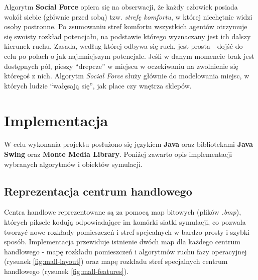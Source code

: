 \documentclass[a4paper, 12pt]{article}
\begin{document}
Algorytm \textbf{Social Force} opiera się na obserwacji, że każdy człowiek posiada wokół siebie (głównie przed sobą) tzw. \textit{strefę komfortu}, w której niechętnie widzi osoby postronne. Po zsumowaniu stref komfortu wszystkich agentów otrzymuje się swoisty rozkład potencjału, na podstawie którego wyznaczany jest ich dalszy kierunek ruchu. Zasada, według której odbywa się ruch, jest prosta - dojść do celu po polach o jak najmniejszym potencjale. Jeśli w danym momencie brak jest dostępnych pól, pieszy ``drepcze'' w miejscu w oczekiwaniu na zwolnienie się któregoś z nich. Algorytm \textit{Social Force} służy głównie do modelowania miejsc, w których ludzie ``wałęsają się'', jak place czy wnętrza sklepów.

\newpage
    \section{Implementacja}
    \label{sec:implementation}

    W celu wykonania projektu posłużono się językiem \textbf{Java} oraz bibliotekami \textbf{Java Swing} oraz \textbf{Monte Media Library}. Poniżej zawarto opis implementacji wybranych algorytmów i obiektów symulacji.

        \subsection{Reprezentacja centrum handlowego}
        \label{sec:mall-impl}

        Centra handlowe reprezentowane są za pomocą map bitowych (plików \emph{.bmp}), których piksele kodują odpowiadające im komórki siatki symulacji, co pozwala tworzyć nowe rozkłady pomieszczeń i stref spejcalnych w bardzo prosty i szybki sposób. Implementacja przewiduje istnienie dwóch map dla każdego centrum handlowego - mapę rozkładu pomieszczeń i algorytmów ruchu fazy operacyjnej (rysunek \ref{fig:mall-layout}) oraz mapę rozkładu stref specjalnych centrum handlowego (rysunek \ref{fig:mall-features}).
\end{document}
